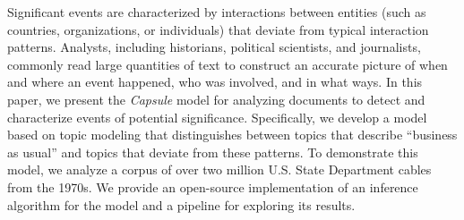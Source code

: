 
Significant events are characterized by interactions between entities
(such as countries, organizations, or individuals) that deviate from
typical interaction patterns. Analysts, including historians,
political scientists, and journalists, commonly read large quantities
of text to construct an accurate picture of when and where an event
happened, who was involved, and in what ways. In this paper, we
present the \textit{Capsule} model for analyzing documents to detect
and characterize events of potential significance. Specifically, we
develop a model based on topic modeling that distinguishes between
topics that describe ``business as usual'' and topics that deviate
from these patterns. To demonstrate this model, we analyze a corpus of
over two million U.S. State Department cables from the 1970s. We
provide an open-source implementation of an inference algorithm for
the model and a pipeline for exploring its results.
